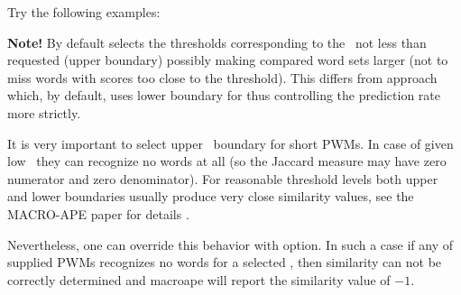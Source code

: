 Try the following examples:


{\small
\textbf{Note!} By default  selects the thresholds corresponding to the \pvalue\ not 
less than requested (upper boundary) possibly making compared word sets larger (not to miss words with scores too close to the threshold).
This differs from  approach which, by default, uses 
lower boundary for \pvalue thus controlling the prediction rate more strictly.

It is very important to select upper \pvalue\ boundary for short PWMs. In case of given 
low \pvalues\ they can recognize no words at all (so the Jaccard measure may have zero 
numerator and zero denominator). For reasonable threshold levels both upper and lower 
boundaries usually produce very close similarity values, see the MACRO-APE paper for details \cite{MACROAPE}.

Nevertheless, one can override this behavior with  option. In such a case if 
any of supplied PWMs recognizes no words for a selected \pvalue, then similarity can not be 
correctly determined and macroape will report the similarity value of $-1$. 
}
